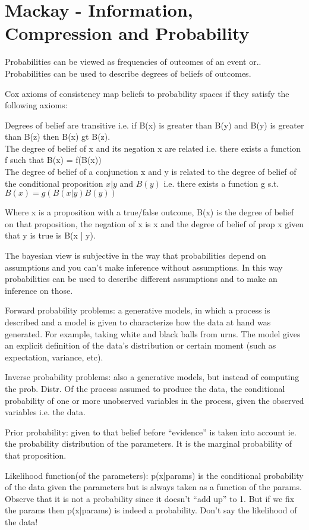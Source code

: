 \section{Mackay - Information, Compression and Probability}

Probabilities can be viewed  as frequencies of outcomes of an event or..\\
Probabilities can be used to describe degrees of beliefs of outcomes.

Cox axioms of consistency map beliefs to probability spaces if they satisfy the following axioms:

Degrees of belief are transitive i.e. if B(x) is greater than B(y) and B(y) is greater than B(z) then B(x) gt B(z). \\
The degree of belief of x and its negation x are related i.e. there exists a function f such that B(x) = f(B(x)) \\
The degree of belief of a conjunction x and y is related to the degree of belief of the conditional proposition $x | y$ and $B(y)$ i.e. there exists a function g s.t. $B(x) = g(B(x | y)B(y))$

Where x is a proposition with a true/false outcome, B(x) is the degree of belief on that proposition, the negation of x is x and the degree of belief of prop x given that y is true is B(x | y).

The bayesian view is subjective in the way that  probabilities depend on assumptions and you can’t make inference without assumptions.
In this way probabilities can be used to describe different assumptions and to make an inference on those. 

Forward probability problems: a generative models, in which a process is described and a model is given to characterize how the data at hand was generated. For example, taking white and black balls from urns. The model gives an explicit definition of the data’s distribution or certain moment (such as expectation, variance, etc).

Inverse probability problems: also a generative models, but instead of computing the prob. Distr. Of the process assumed to produce the data, the conditional probability of one or more unobserved variables in the process, given the observed variables i.e. the data.

Prior probability: given to that belief before “evidence” is taken into account ie. the probability distribution of the parameters. It is the marginal probability of that proposition. 

Likelihood function(of the parameters): p(x|params) is the conditional probability of the data given the parameters but is always taken as a function of the params. Observe that it is not a probability since it doesn't “add up” to 1. But if we fix the params then p(x|params) is indeed a probability. 
Don’t say the likelihood of the data!

